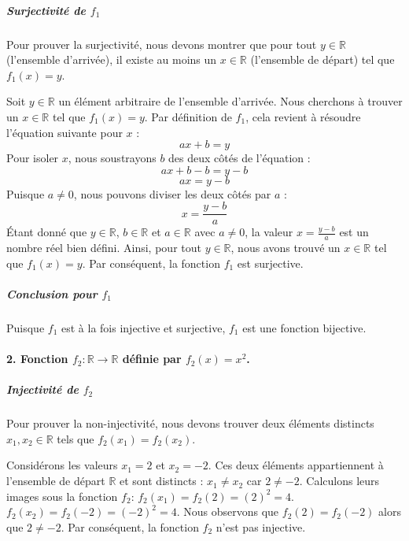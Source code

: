 \documentclass[12pt,a4paper]{report}
\begin{document}
\subparagraph{\texorpdfstring{Surjectivité de
\(f_1\)}{Surjectivité de f\_1}}\label{surjectivituxe9-de-f_1}

Pour prouver la surjectivité, nous devons montrer que pour tout
\(y \in \mathbb{R}\) (l'ensemble d'arrivée), il existe au moins un
\(x \in \mathbb{R}\) (l'ensemble de départ) tel que \(f_1(x) = y\).

Soit \(y \in \mathbb{R}\) un élément arbitraire de l'ensemble d'arrivée.
Nous cherchons à trouver un \(x \in \mathbb{R}\) tel que \(f_1(x) = y\).
Par définition de \(f_1\), cela revient à résoudre l'équation suivante
pour \(x\) : \[ax + b = y\] Pour isoler \(x\), nous soustrayons \(b\)
des deux côtés de l'équation : \[ax + b - b = y - b\] \[ax = y - b\]
Puisque \(a \neq 0\), nous pouvons diviser les deux côtés par \(a\) :
\[x = \frac{y - b}{a}\] Étant donné que \(y \in \mathbb{R}\),
\(b \in \mathbb{R}\) et \(a \in \mathbb{R}\) avec \(a \neq 0\), la
valeur \(x = \frac{y - b}{a}\) est un nombre réel bien défini. Ainsi,
pour tout \(y \in \mathbb{R}\), nous avons trouvé un
\(x \in \mathbb{R}\) tel que \(f_1(x) = y\). Par conséquent, la fonction
\(f_1\) est surjective.

\subparagraph{\texorpdfstring{Conclusion pour
\(f_1\)}{Conclusion pour f\_1}}\label{conclusion-pour-f_1}

Puisque \(f_1\) est à la fois injective et surjective, \(f_1\) est une
fonction bijective.

\paragraph{\texorpdfstring{2. Fonction
\(f_2: \mathbb{R} \to \mathbb{R}\) définie par
\(f_2(x) = x^2\).}{2. Fonction f\_2: \textbackslash mathbb\{R\} \textbackslash to \textbackslash mathbb\{R\} définie par f\_2(x) = x\^{}2.}}\label{fonction-f_2-mathbbr-to-mathbbr-duxe9finie-par-f_2x-x2.}

\subparagraph{\texorpdfstring{Injectivité de
\(f_2\)}{Injectivité de f\_2}}\label{injectivituxe9-de-f_2}

Pour prouver la non-injectivité, nous devons trouver deux éléments
distincts \(x_1, x_2 \in \mathbb{R}\) tels que \(f_2(x_1) = f_2(x_2)\).

Considérons les valeurs \(x_1 = 2\) et \(x_2 = -2\). Ces deux éléments
appartiennent à l'ensemble de départ \(\mathbb{R}\) et sont distincts :
\(x_1 \neq x_2\) car \(2 \neq -2\). Calculons leurs images sous la
fonction \(f_2\): \(f_2(x_1) = f_2(2) = (2)^2 = 4\).
\(f_2(x_2) = f_2(-2) = (-2)^2 = 4\). Nous observons que
\(f_2(2) = f_2(-2)\) alors que \(2 \neq -2\). Par conséquent, la
fonction \(f_2\) n'est pas injective.
\end{document}

